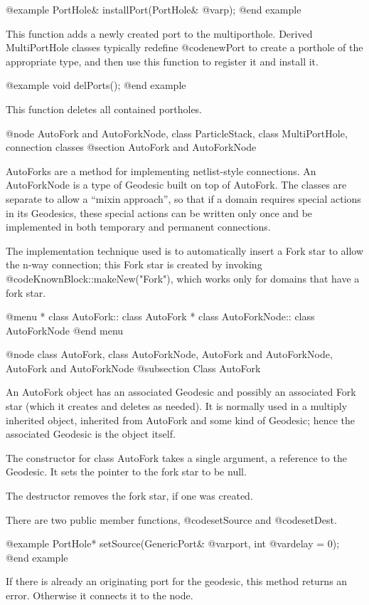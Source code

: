 @example
PortHole& installPort(PortHole& @var{p});
@end example

This function adds a newly created port to the multiporthole.  Derived
MultiPortHole classes typically redefine @code{newPort} to create a
porthole of the appropriate type, and then use this function to register
it and install it.

@example
void delPorts();
@end example

This function deletes all contained portholes.

@node AutoFork and AutoForkNode, class ParticleStack, class MultiPortHole, connection classes
@section AutoFork and AutoForkNode

AutoForks are a method for implementing netlist-style connections.
An AutoForkNode is a type of Geodesic built on top of AutoFork.
The classes are separate to allow a ``mixin approach'', so that if
a domain requires special actions in its Geodesics, these special
actions can be written only once and be implemented in both
temporary and permanent connections.

The implementation technique used is to automatically insert a Fork
star to allow the n-way connection; this Fork star is created by
invoking @code{KnownBlock::makeNew("Fork")}, which works only for
domains that have a fork star.

@menu
* class AutoFork::              class AutoFork
* class AutoForkNode::          class AutoForkNode
@end menu

@node class AutoFork, class AutoForkNode, AutoFork and AutoForkNode, AutoFork and AutoForkNode
@subsection Class AutoFork

An AutoFork object has an associated Geodesic and possibly an associated
Fork star (which it creates and deletes as needed).  It is normally used
in a multiply inherited object, inherited from AutoFork and some kind
of Geodesic; hence the associated Geodesic is the object itself.

The constructor for class AutoFork takes a single argument, a reference
to the Geodesic.  It sets the pointer to the fork star to be null.

The destructor removes the fork star, if one was created.

There are two public member functions, @code{setSource} and
@code{setDest}.

@example
PortHole* setSource(GenericPort& @var{port}, int @var{delay} = 0);
@end example

If there is already an originating port for the geodesic, this method
returns an error.  Otherwise it connects it to the node.

